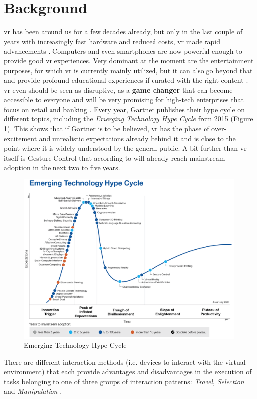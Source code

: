 \section{Background}

\gls{vr} has been around us for a few decades already, but only in the last couple of years with increasingly fast hardware and reduced costs, \gls{vr} made rapid advancements \citep{vrs2015}. Computers and even smartphones are now powerful enough to provide good \gls{vr} experiences.\newline
Very dominant at the moment are the entertainment purposes, for which \gls{vr} is currently mainly utilized, but it can also go beyond that and provide profound educational experiences if curated with the right content \citep{Safrudin2015}. \gls{vr} even should be seen as disruptive, as a \textbf{game changer} that can become accessible to everyone and will be very promising for high-tech enterprises that focus on retail and banking \citep{Safrudin2015}. \newline
Every year, Gartner publishes their hype cycle on different topics, including the \textit{Emerging Technology Hype Cycle} from 2015 (Figure \ref{fig:hypecycle}). This shows that if Gartner is to be believed, \gls{vr} has the phase of over-excitement and unrealistic expectations already behind it and is close to the point where it is widely understood by the general public. A bit further than \gls{vr} itself is Gesture Control that according to \cite{Gartner2015} will already reach mainstream adoption in the next two to five years.
\begin{figure}[h]
	\begin{center}
		\includegraphics[width=14cm]{03_Figures/03_Gartner/Gartner_EmergingTech2015.png}
		\caption[Emerging Technology Hype Cycle]{Emerging Technology Hype Cycle \citep{Gartner2015b}}
		\label{fig:hypecycle}
	\end{center}
\end{figure} \newline
There are different interaction methods (i.e. devices to interact with the virtual environment) that each provide advantages and disadvantages in the execution of tasks belonging to one of three groups of interaction patterns: \textit{Travel}, \textit{Selection} and \textit{Manipulation} \citep{Bowman2002}. 


